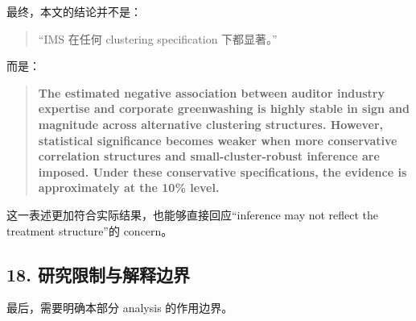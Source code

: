 \documentclass[11pt]{article}
\begin{document}
最终，本文的结论并不是：

\begin{quote}
“IMS 在任何 clustering specification 下都显著。”
\end{quote}

而是：

\begin{quote}
\textbf{The estimated negative association between auditor industry expertise and corporate greenwashing is highly stable in sign and magnitude across alternative clustering structures. However, statistical significance becomes weaker when more conservative correlation structures and small-cluster-robust inference are imposed. Under these conservative specifications, the evidence is approximately at the 10\% level.}
\end{quote}

这一表述更加符合实际结果，也能够直接回应“inference may not reflect the treatment structure”的 concern。

\subsection{18. 研究限制与解释边界}

最后，需要明确本部分 analysis 的作用边界。
\end{document}
